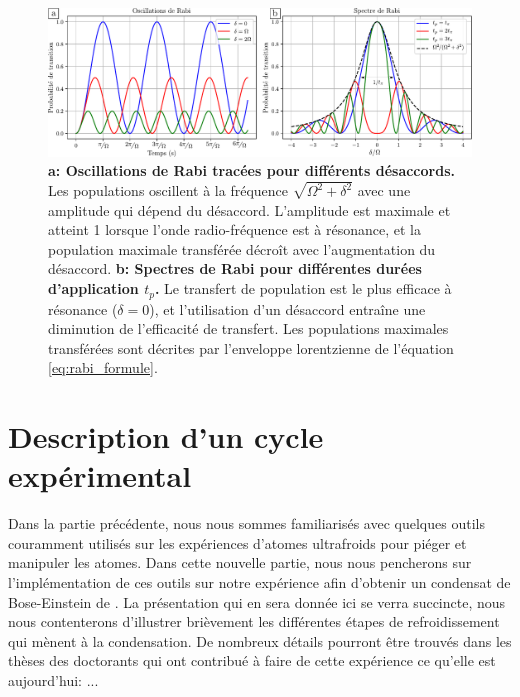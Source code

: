 \begin{figure}
\centering
\includegraphics[width=\textwidth]{Fig/BEC_manip/rabi.pdf}
\caption{\textbf{a: Oscillations de Rabi tracées pour différents désaccords.} Les populations oscillent à la fréquence $\sqrt{\Omega^2+\delta^2}$ avec une amplitude qui dépend du désaccord. L'amplitude est maximale et atteint 1 lorsque l'onde radio-fréquence est à résonance, et la population maximale transférée décroît avec l'augmentation du désaccord. \textbf{b: Spectres de Rabi pour différentes durées d'application $t_p$.} Le transfert de population est le plus efficace à résonance ($\delta=0$), et l'utilisation d'un désaccord entraîne une diminution de l'efficacité de transfert. Les populations maximales transférées sont décrites par l'enveloppe lorentzienne de l'équation \ref{eq:rabi_formule}.}
\label{fig:rabi}
\end{figure}






\section{Description d'un cycle expérimental}
Dans la partie précédente, nous nous sommes familiarisés avec quelques outils couramment utilisés sur les expériences d'atomes ultrafroids pour piéger et manipuler les atomes. Dans cette nouvelle partie, nous nous pencherons sur l'implémentation de ces outils sur notre expérience afin d'obtenir un condensat de Bose-Einstein de . La présentation qui en sera donnée ici se verra succincte, nous nous contenterons d'illustrer brièvement les différentes étapes de refroidissement qui mènent à la condensation. De nombreux détails pourront être trouvés dans les thèses des doctorants qui ont contribué à faire de cette expérience ce qu'elle est aujourd'hui: \citep{fauquembergue2004realisation}\citep{riou2006etude}\citep{bernard2010transport}\citep{jendrzejewski2012quantum}\citep{muller2015coherent}\citep{denechaud2018vers}... 

